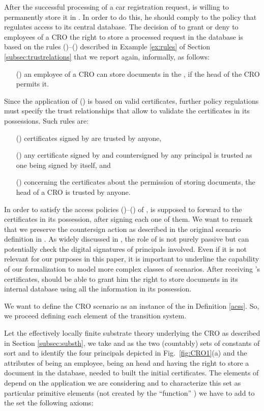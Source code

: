 \documentclass[conference]{llncs}
\newcommand{\CRO}{CRO}
\begin{document}
{After the successful processing of a car registration request,  is
willing to permanently store it in . In order to do this, he
should comply to the  policy that regulates access to its central
database. The decision of  to grant or deny to employees of a
\CRO{} the right to store a processed request in the database is based
on the rules ()--() described in Example \ref{ex:rules} of Section \ref{subsec:trustrelations} 
that we report again, informally, as follows: 
\begin{enumerate}
\item[()] an employee of a \CRO{} can store documents in the ,
if the head of the \CRO{} permits it.
\end{enumerate}
Since the application of () is based on valid certificates, further
policy regulations must specify the trust relationships that allow
 to validate the certificates in its possessions. Such rules are:
\begin{enumerate}
\item[()] certificates signed by  are trusted by anyone, 
\item[()] any certificate signed by  and countersigned by any
principal is trusted as one being signed by  itself, and 
\item[()] concerning the certificates about the permission of storing
documents, the head of a \CRO{} is trusted by anyone.
\end{enumerate}

In order to satisfy the access policies ()--() of ,  is
supposed to forward to  the certificates 
in its possession, after signing each one of them. We want to remark that we preserve the countersign action
as described in the original scenario definition in \cite{avantssar}. As widely discussed in \cite{BRV-TR09},
the role of  is not purely passive but can potentially check the digital signatures of principals 
involved. Even if it is not relevant for our purposes in this paper, it is important to underline the capability of our formalization to model
more complex classes of scenarios.
After receiving 's certificates,  should be able to
grant him the right to store documents in its internal database using all the information
in its possession.






We want to define the \CRO{} scenario as an instance of the  in Definition \ref{acss}.
So, we proceed defining each element of the transition system.

 Let  the effectively locally finite substrate theory underlying the \CRO{} 
as described in Section \ref{subsec:substh}, we take    and  as the two (countably) sets of constants of sort  and  to identify the four principals depicted in
Fig.~\ref{fig:CRO1}(a) and the attributes of being an employee, being an head and
having the right to store a document in the database, needed to built the initial certificates. 
The elements of  depend on the application we are considering and 
to characterize this set as particular primitive elements (not created by the ``function'' ) we have to add to the set  the following axioms:

}
\end{document}
